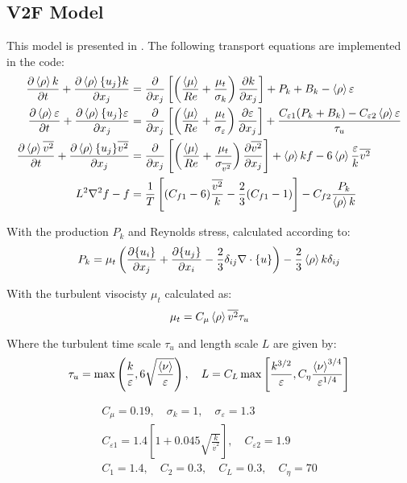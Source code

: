 \subsection{V2F Model}
This model is presented in \cite{durbin1995separated}.
The following transport equations are implemented in the code:
\begin{equation} \label{eq:ktDeng}
\begin{split}
\frac{\partial \left<{\rho}\right> k }{\partial {t}} + \frac{\partial \left<{\rho}\right>\{{u_j}\}k}{\partial {x_j}} &= \frac{\partial}{\partial x_j}\left[\left(\frac{\left<{\mu}\right>}{Re} + \frac{\mu_t}{\sigma_k}\right)\frac{\partial k}{\partial {x_j}}\right] + P_{k} + B_k- \left<{\rho}\right>\varepsilon \\
\frac{\partial \left<{\rho}\right> \varepsilon}{\partial {t}} + \frac{\partial \left<{\rho}\right> \{{u_j}\} \varepsilon}{\partial {x_j}} &= \frac{\partial}{\partial x_j}\left[ \left(\frac{\left<{\mu}\right>}{Re} + \frac{\mu_t}{\sigma_{\varepsilon}}\right)\frac{\partial \varepsilon}{\partial {x_j}}\right] + \frac{C_{\varepsilon1}(P_k+B_k)  -C_{\varepsilon2} \left<{\rho}\right> \varepsilon}{\tau_u}   \\
\frac{\partial  \left<{\rho}\right> \overline{v^2}}{\partial {t}} + \frac{\partial  \left<{\rho}\right> \{{u_j}\} \overline{v^2}}{\partial {x_j}}           &= \frac{\partial}{\partial x_j}\left[ \left(\frac{\left<{\mu}\right>}{Re} + \frac{\mu_t}{\sigma_{\overline{v^2}}}\right)\frac{\partial \overline{v^2}}{\partial {x_j}}\right] + \left<{\rho}\right> k f - 6\left<{\rho}\right> \frac{\varepsilon}{k}\overline{v^2} \\
L^2\nabla^2 f -f &= \frac{1}{T}\left[(C_{f1}-6)\frac{\overline{v^2}}{k}-\frac{2}{3}(C_{f1}-1)\right]-C_{f2}\frac{P_k}{\left<{\rho}\right> k}
\end{split}
\end{equation}

With the production $P_k$ and Reynolds stress, calculated according to:
\begin{equation}
P_k = \mu_t \left(\frac{\partial \{{u_i}\}}{\partial {x_j}} +\frac{\partial \{{u_j}\}}{\partial {x_i}} - \frac{2}{3}\delta_{ij} \nabla \cdot \{{u}\} \right) - \frac{2}{3} \left<{\rho}\right> k \delta_{ij}
\end{equation}

With the turbulent visocisty $\mu_t$ calculated as:
\begin{equation}
\mu_t = C_\mu \left<{\rho}\right> \overline{v^2} \tau_u
\end{equation}

Where the turbulent time scale $\tau_u$ and length scale $L$ are given by:
\begin{equation}
\tau_u = \max\left(\frac{k}{\varepsilon},6\sqrt{\frac{\left<{\nu}\right>}{\varepsilon}}\right), \quad L = C_L \max\left[\frac{k^{3/2}}{\varepsilon},C_\eta\frac{\left<{\nu}\right>^{3/4}}{\varepsilon^{1/4}}\right]
\end{equation}

\begin{equation}
\begin{split}
C_\mu = 0.19,\quad  \sigma_k = 1, \quad \sigma_\varepsilon =1.3 \\
C_{\varepsilon1} = 1.4\left[1+0.045\sqrt{\frac{k}{\overline{v}^2}}\right], \quad C_{\varepsilon2} = 1.9 \\
C_1 = 1.4, \quad C_2 = 0.3, \quad C_L=0.3, \quad C_\eta = 70
\end{split}
\end{equation}

